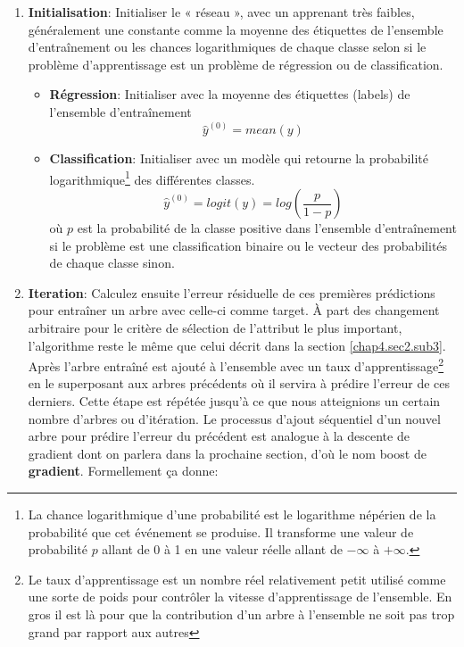 \begin{enumerate}
    \item \textbf{Initialisation}: Initialiser le « réseau », avec un apprenant très faibles, généralement une constante comme la moyenne des étiquettes de l'ensemble d'entraînement ou les chances logarithmiques de chaque classe selon si le problème d'apprentissage est un problème de régression ou de classification.
    \begin{itemize}
        \item \textbf{Régression}: Initialiser avec la moyenne des étiquettes (labels) de l'ensemble d'entraînement \[\hat{y}^{(0)} = mean(y)\]
        \item \textbf{Classification}: Initialiser avec un modèle qui retourne la probabilité logarithmique\footnote{La chance logarithmique d'une probabilité est le logarithme népérien de la probabilité que cet événement se produise. Il transforme une valeur de probabilité \(p\) allant de 0 à 1 en une valeur réelle allant de \(-\infty\) à \(+\infty\).} des différentes classes. \[\hat{y}^{(0)} = logit(y) = log(\frac{p}{1 - p})\] où \(p\) est la probabilité de la classe positive dans l'ensemble d'entraînement si le problème est une classification binaire ou le vecteur des probabilités de chaque classe sinon.
    \end{itemize}
    \item \textbf{Iteration}: Calculez ensuite l'erreur résiduelle de ces premières prédictions pour entraîner un arbre avec celle-ci comme target. À part des changement arbitraire pour le critère de sélection de l'attribut le plus important, l'algorithme reste le même que celui décrit dans la section \ref{chap4.sec2.sub3}. Après l'arbre entraîné est ajouté à l'ensemble avec un taux d'apprentissage\footnote{Le taux d'apprentissage est un nombre réel relativement petit utilisé comme une sorte de poids pour contrôler la vitesse d'apprentissage de l'ensemble. En gros il est là pour que la contribution d'un arbre à l'ensemble ne soit pas trop grand par rapport aux autres} en le superposant aux arbres précédents où il servira à prédire l'erreur de ces derniers. Cette étape est répétée jusqu'à ce que nous atteignions un certain nombre d'arbres ou d'itération. Le processus d'ajout séquentiel d'un nouvel arbre pour prédire l'erreur du précédent est analogue à la descente de gradient dont on parlera dans la prochaine section, d'où le nom boost de \textbf{gradient}. Formellement ça donne:


\end{enumerate}
